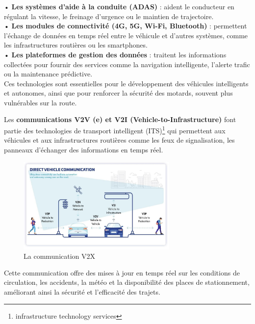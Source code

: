 • \textbf{Les systèmes d’aide à la conduite (ADAS)} : aident le conducteur en régulant la vitesse, le freinage d’urgence ou le maintien de trajectoire.\\
• \textbf{Les modules de connectivité (4G, 5G, Wi-Fi, Bluetooth)} : permettent l’échange de données en temps réel entre le véhicule et d’autres systèmes, comme les infrastructures routières ou les smartphones.\\
• \textbf{Les plateformes de gestion des données} : traitent les informations collectées pour fournir des services comme la navigation intelligente, l’alerte trafic ou la maintenance prédictive.\\
Ces technologies sont essentielles pour le développement des véhicules intelligents et autonomes, ainsi que pour renforcer la sécurité des motards, souvent plus vulnérables sur la route.
\vspace{0.5cm}

Les \textbf{communications V2V (e) et V2I (Vehicle-to-Infrastructure)} font partie des technologies de transport intelligent (ITS)\footnote{infrastructure technology services} qui permettent aux véhicules et aux infrastructures routières comme les feux de signalisation, les panneaux d’échanger des informations en temps réel.

\begin{figure}[H]
    \centering
    \includegraphics[width=0.7\textwidth]{images/schema_v2.png} 
    \caption{La communication V2X}
\end{figure}

Cette communication offre des mises à jour en temps réel sur les conditions de circulation, les accidents, la météo et la disponibilité des places de stationnement, améliorant ainsi la sécurité et l’efficacité des trajets\cite{joberty_blog}.\\
